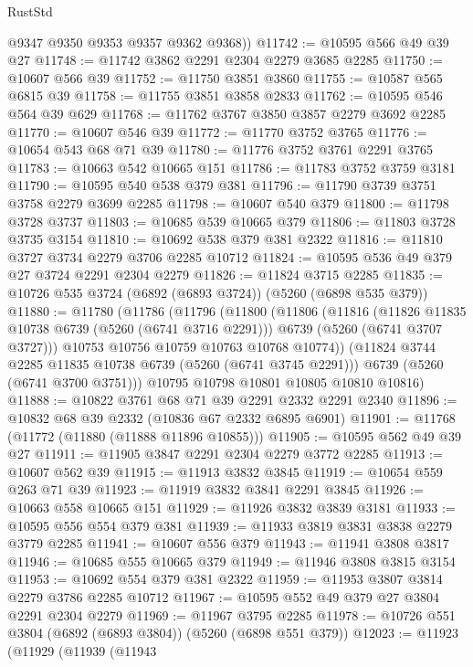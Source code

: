 \begin{lexlean}{RustStd}
\begin{coremodule}
        @9347
        @9350
        @9353
        @9357
        @9362
        @9368))
@11742 := @10595 @566 @49 @39 @27
@11748 := @11742 @3862 @2291 @2304 @2279 @3685 @2285
@11750 := @10607 @566 @39
@11752 := @11750 @3851 @3860
@11755 := @10587 @565 @6815 @39
@11758 := @11755 @3851 @3858 @2833
@11762 := @10595 @546 @564 @39 @629
@11768 := @11762 @3767 @3850 @3857 @2279 @3692 @2285
@11770 := @10607 @546 @39
@11772 := @11770 @3752 @3765
@11776 := @10654 @543 @68 @71 @39
@11780 := @11776 @3752 @3761 @2291 @3765
@11783 := @10663 @542 @10665 @151
@11786 := @11783 @3752 @3759 @3181
@11790 := @10595 @540 @538 @379 @381
@11796 := @11790 @3739 @3751 @3758 @2279 @3699 @2285
@11798 := @10607 @540 @379
@11800 := @11798 @3728 @3737
@11803 := @10685 @539 @10665 @379
@11806 := @11803 @3728 @3735 @3154
@11810 := @10692 @538 @379 @381 @2322
@11816 := @11810 @3727 @3734 @2279 @3706 @2285 @10712
@11824 := @10595 @536 @49 @379 @27 @3724 @2291 @2304 @2279
@11826 := @11824 @3715 @2285
@11835 := @10726 @535 @3724 (@6892 (@6893 @3724)) (@5260 (@6898 @535 @379))
@11880 := @11780
    (@11786
      (@11796
        (@11800
          (@11806
            (@11816
              (@11826 @11835 @10738 @6739 (@5260 (@6741 @3716 @2291)))
              @6739
              (@5260 (@6741 @3707 @3727)))
            @10753
            @10756
            @10759
            @10763
            @10768
            @10774))
        (@11824 @3744 @2285 @11835 @10738 @6739 (@5260 (@6741 @3745 @2291)))
        @6739
        (@5260 (@6741 @3700 @3751)))
      @10795
      @10798
      @10801
      @10805
      @10810
      @10816)
@11888 := @10822 @3761 @68 @71 @39 @2291 @2332 @2291 @2340
@11896 := @10832 @68 @39 @2332 (@10836 @67 @2332 @6895 @6901)
@11901 := @11768 (@11772 (@11880 (@11888 @11896 @10855)))
@11905 := @10595 @562 @49 @39 @27
@11911 := @11905 @3847 @2291 @2304 @2279 @3772 @2285
@11913 := @10607 @562 @39
@11915 := @11913 @3832 @3845
@11919 := @10654 @559 @263 @71 @39
@11923 := @11919 @3832 @3841 @2291 @3845
@11926 := @10663 @558 @10665 @151
@11929 := @11926 @3832 @3839 @3181
@11933 := @10595 @556 @554 @379 @381
@11939 := @11933 @3819 @3831 @3838 @2279 @3779 @2285
@11941 := @10607 @556 @379
@11943 := @11941 @3808 @3817
@11946 := @10685 @555 @10665 @379
@11949 := @11946 @3808 @3815 @3154
@11953 := @10692 @554 @379 @381 @2322
@11959 := @11953 @3807 @3814 @2279 @3786 @2285 @10712
@11967 := @10595 @552 @49 @379 @27 @3804 @2291 @2304 @2279
@11969 := @11967 @3795 @2285
@11978 := @10726 @551 @3804 (@6892 (@6893 @3804)) (@5260 (@6898 @551 @379))
@12023 := @11923
    (@11929
      (@11939
        (@11943

\end{coremodule}
\end{lexlean}
